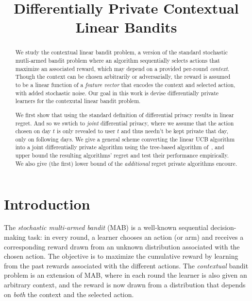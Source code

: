 \documentclass{article}
\title{Differentially Private Contextual Linear Bandits}
\makeatletter
\newcommand{\iid}{\text{i.i.d.\@}}
\makeatother
\begin{document}
\setlength{\intextsep}{4pt}
\setlength{\textfloatsep}{4pt}
\setlength{\abovedisplayskip}{3pt}
\setlength{\belowdisplayskip}{3pt}

\maketitle

\begin{abstract}
  We study the contextual linear bandit problem, a version of the standard stochastic mutli-armed bandit problem where an algorithm
  sequentially selects actions that maximize an associated reward,
  which may depend on a provided per-round \emph{context}. Though the context can be chosen arbitrarily or adversarially, the reward is assumed to be a linear function of a
  \emph{feature vector} that encodes the context and selected action,
  with added stochastic noise. Our goal in this work is devise differentially private learners for the contexutal linear bandit problem.

  We first show that using the standard definition of differential privacy results in linear regret. And so we swtich to \emph{joint} differential privacy, where we assume that the action chosen on day $t$ is only revealed to user $t$ and thus needn't be kept private that day, only on following days. We give a general scheme converting the linear UCB algorithm into a joint differentially private algorithm using the tree-based algorithm of~\cite{ChanPrivateContinualRelease2010,DworkContinualObservation2010}, and upper bound the resulting algorithms' regret and test their performance empirically. We also give (the first) lower bound of the \emph{additional} regret private algorithms encoure.
 \end{abstract}

\section{Introduction}
\label{sec:introduction}

The \emph{stochastic multi-armed bandit} (MAB) is a well-known
sequential decision-making task: in every round, a learner chooses an
action (or arm) and receives a corresponding reward drawn \iid{}
from an unknown distribution associated with the chosen action.  The
objective is to maximize the cumulative reward by learning from the
past rewards associated with the different actions.  The
\emph{contextual} bandit problem is an extension of MAB, where in each
round the learner is also given an arbitrary context, and the reward
is now drawn from a distribution that depends on \emph{both} the
context and the selected action.
\end{document}
